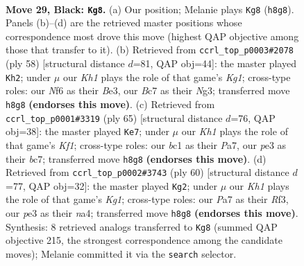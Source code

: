 \documentclass[11pt]{article}
\begin{document}
\clearpage

\begin{figure}[p]\centering
\begin{subfigure}{0.46\textwidth}\centering
\resizebox{\linewidth}{!}{%
\newchessgame
\chessboard[
  setfen={4r2k/pBbb2pp/P4n2/1p3p2/1n3P2/1P2PRP1/8/RNB3K1 b - - 7 29},
  showmover=false,
  pgfstyle=straightmove, color=movearrow, markmove={h8-g8}
]}
\caption{}
\end{subfigure}\hfill
\begin{subfigure}{0.46\textwidth}\centering
\resizebox{\linewidth}{!}{%
\newchessgame
\chessboard[
  setfen={6n1/1kp4r/3bbp2/1p2p2p/1P2P2N/P3BPN1/2R3P1/6K1 w - - 5 30},
  showmover=false,
  pgfstyle=straightmove, color=movearrow, markmove={g1-h2}
]}
\caption{}
\end{subfigure}
\\[4pt]
\begin{subfigure}{0.46\textwidth}\centering
\resizebox{\linewidth}{!}{%
\newchessgame
\chessboard[
  setfen={4rk2/ppB3p1/2p3Pp/2n2p1P/4b3/1P4K1/P1P4R/3B4 b - - 0 33},
  showmover=false,
  pgfstyle=straightmove, color=movearrow, markmove={f8-e7}
]}
\caption{}
\end{subfigure}\hfill
\begin{subfigure}{0.46\textwidth}\centering
\resizebox{\linewidth}{!}{%
\newchessgame
\chessboard[
  setfen={4b3/2k4r/p2pr1pp/1p2p3/nP2P1PN/5R1P/2PB1P2/4R1K1 w - - 1 31},
  showmover=false,
  pgfstyle=straightmove, color=movearrow, markmove={g1-g2}
]}
\caption{}
\end{subfigure}
\caption{\textbf{Move 29, Black: \texttt{Kg8}.} (a) Our position; Melanie plays \texttt{Kg8} (\texttt{h8g8}). Panels (b)--(d) are the retrieved master positions whose correspondence most drove this move (highest QAP objective among those that transfer to it). (b) Retrieved from \texttt{ccrl\_top\_p0003\#2078} (ply 58) [structural distance $d$=81, QAP obj=44]: the master played \texttt{Kh2}; under $\mu$ our \emph{Kh1} plays the role of that game's \emph{Kg1}; cross-type roles: our \emph{N}f6 as their \emph{B}e3, our \emph{B}c7 as their \emph{N}g3; transferred move \texttt{h8g8} \textbf{(endorses this move)}. (c) Retrieved from \texttt{ccrl\_top\_p0001\#3319} (ply 65) [structural distance $d$=76, QAP obj=38]: the master played \texttt{Ke7}; under $\mu$ our \emph{Kh1} plays the role of that game's \emph{Kf1}; cross-type roles: our \emph{b}c1 as their \emph{P}a7, our \emph{p}e3 as their \emph{b}c7; transferred move \texttt{h8g8} \textbf{(endorses this move)}. (d) Retrieved from \texttt{ccrl\_top\_p0002\#3743} (ply 60) [structural distance $d$=77, QAP obj=32]: the master played \texttt{Kg2}; under $\mu$ our \emph{Kh1} plays the role of that game's \emph{Kg1}; cross-type roles: our \emph{P}a7 as their \emph{R}f3, our \emph{p}e3 as their \emph{n}a4; transferred move \texttt{h8g8} \textbf{(endorses this move)}. Synthesis: 8 retrieved analogs transferred to \texttt{Kg8} (summed QAP objective 215, the strongest correspondence among the candidate moves); Melanie committed it via the \texttt{search} selector.}
\label{fig:thought-m57}
\end{figure}
\end{document}
